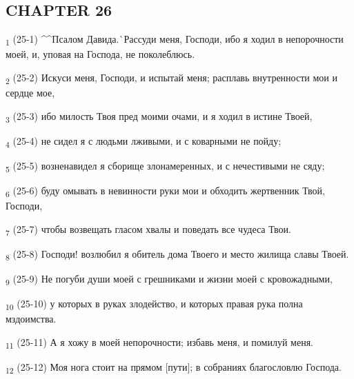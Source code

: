 \subsection{CHAPTER 26}
\begin{tcolorbox}
\textsubscript{1} (25-1) ^^Псалом Давида.^^ Рассуди меня, Господи, ибо я ходил в непорочности моей, и, уповая на Господа, не поколеблюсь.
\end{tcolorbox}
\begin{tcolorbox}
\textsubscript{2} (25-2) Искуси меня, Господи, и испытай меня; расплавь внутренности мои и сердце мое,
\end{tcolorbox}
\begin{tcolorbox}
\textsubscript{3} (25-3) ибо милость Твоя пред моими очами, и я ходил в истине Твоей,
\end{tcolorbox}
\begin{tcolorbox}
\textsubscript{4} (25-4) не сидел я с людьми лживыми, и с коварными не пойду;
\end{tcolorbox}
\begin{tcolorbox}
\textsubscript{5} (25-5) возненавидел я сборище злонамеренных, и с нечестивыми не сяду;
\end{tcolorbox}
\begin{tcolorbox}
\textsubscript{6} (25-6) буду омывать в невинности руки мои и обходить жертвенник Твой, Господи,
\end{tcolorbox}
\begin{tcolorbox}
\textsubscript{7} (25-7) чтобы возвещать гласом хвалы и поведать все чудеса Твои.
\end{tcolorbox}
\begin{tcolorbox}
\textsubscript{8} (25-8) Господи! возлюбил я обитель дома Твоего и место жилища славы Твоей.
\end{tcolorbox}
\begin{tcolorbox}
\textsubscript{9} (25-9) Не погуби души моей с грешниками и жизни моей с кровожадными,
\end{tcolorbox}
\begin{tcolorbox}
\textsubscript{10} (25-10) у которых в руках злодейство, и которых правая рука полна мздоимства.
\end{tcolorbox}
\begin{tcolorbox}
\textsubscript{11} (25-11) А я хожу в моей непорочности; избавь меня, и помилуй меня.
\end{tcolorbox}
\begin{tcolorbox}
\textsubscript{12} (25-12) Моя нога стоит на прямом [пути]; в собраниях благословлю Господа.
\end{tcolorbox}
